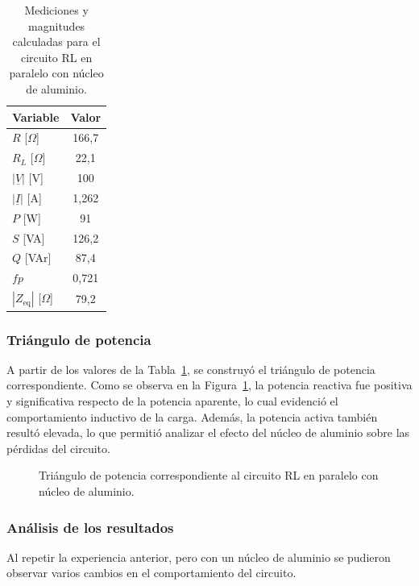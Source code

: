 \begin{table}[H]
    \centering
    \caption{Mediciones y magnitudes calculadas para el circuito RL en paralelo con núcleo de aluminio.}
    \label{tab:tp3_aluminio_l2}
    \begin{tabular}{lc}
        \toprule
        Variable & Valor \\
        \midrule
        $R$ [$\Omega$] & 166,7 \\
        $R_L$ [$\Omega$] & 22,1 \\
        $|\underline{V}|$ [V] & 100 \\
        $|\underline{I}|$ [A] & 1,262 \\
        $P$ [W] & 91 \\
        $S$ [VA] & 126,2 \\
        $Q$ [VAr] & 87,4 \\
        $fp$ & 0,721 \\
        $|Z_{\text{eq}}|$ [$\Omega$] & 79,2 \\
        \bottomrule
    \end{tabular}
\end{table}

\subsubsection{Triángulo de potencia}

A partir de los valores de la Tabla~\ref{tab:tp3_aluminio_l2}, se construyó el triángulo de potencia correspondiente. Como se observa en la Figura~\ref{fig:triangulo_aluminio}, la potencia reactiva fue positiva y significativa respecto de la potencia aparente, lo cual evidenció el comportamiento inductivo de la carga. Además, la potencia activa también resultó elevada, lo que permitió analizar el efecto del núcleo de aluminio sobre las pérdidas del circuito.

\begin{figure}[H]
    \centering
    \caption{Triángulo de potencia correspondiente al circuito RL en paralelo con núcleo de aluminio.}
    \label{fig:triangulo_aluminio}
\end{figure}

\subsubsection{Análisis de los resultados}

Al repetir la experiencia anterior, pero con un núcleo de aluminio se pudieron observar varios cambios en el comportamiento del circuito.

